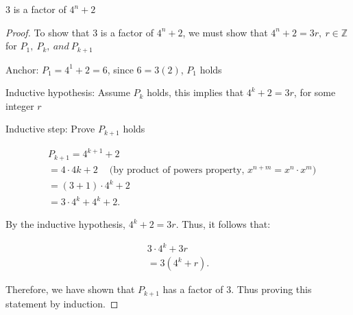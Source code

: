 \documentclass{report}
\begin{document}
    \pagebreak \bigbreak \noindent  
    \begin{prop}
       $3$ is a factor of $4^{n} + 2$ 
    \end{prop}
    \bigbreak \noindent 
    \begin{proof}
        To show that 3 is a factor of $4^{n} + 2$, we must show that $4^{n} + 2 = 3r,\ r \in \mathbb{Z}$ for $P_{1},\ P_{k},\ and\ P_{k+1}$
        \bigbreak \noindent 

        Anchor: $P_{1} = 4^{1} + 2 = 6$, since $6 = 3(2)$, $P_{1}$ holds
        \bigbreak \noindent 

        Inductive hypothesis: Assume $P_{k}$ holds, this implies that $4^{k} + 2 = 3r$, for some integer $r$
        \bigbreak \noindent 

        Inductive step: Prove $P_{k+1}$ holds

        \begin{align*}
            &P_{k+1} = 4^{k+1} + 2 \\
            &= 4\cdot 4k+2\ \quad \text{(by product of powers property, $x^{n+m} = x^{n} \cdot x^{m}$)} \\
            &=(3+1)\cdot 4^{k}  +2  \\
            &=3\cdot 4^{k} +4^{k}  + 2
        .\end{align*}
        \bigbreak \noindent 

        By the inductive hypothesis, $4^{k} + 2 = 3r$. Thus, it follows that:

        \begin{align*}
            3\cdot 4^{k} + 3r \\
            = 3(4^{k} + r)
        .\end{align*}
        \bigbreak \noindent 

        Therefore, we have shown that $P_{k+1}$ has a factor of 3. Thus proving this statement by induction.
        \bigbreak \noindent \ep


    \end{proof}
    
    
    
        
    



    
    
    


    
    
    
    
    
    
    
    
    



    
    

    

    










    
    
\end{document}
